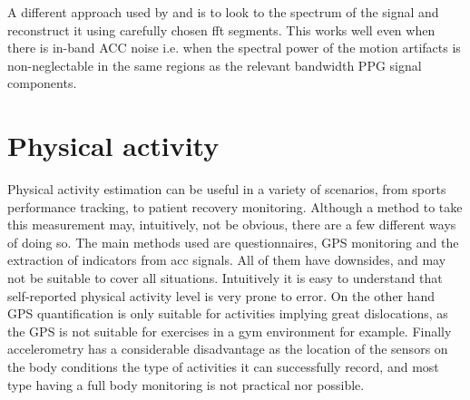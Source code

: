 A different approach used by \citet{zhang2015joss} and \citet{zhang2015troika} is to look to the spectrum of the signal and reconstruct it using carefully chosen \ac{fft} segments. This works well even when there is in-band ACC noise i.e. when the spectral power of the motion artifacts is non-neglectable in the same regions as the relevant bandwidth PPG signal components.


%
%

%

\section{Physical activity}

Physical activity estimation can be useful in a variety of scenarios, from sports performance tracking, to patient recovery monitoring. Although a method to take this measurement may, intuitively, not be obvious, there are a few different ways of doing so. The main methods used are questionnaires, GPS monitoring and the extraction of indicators from \ac{acc} signals. All of them have downsides, and may not be suitable to cover all situations. Intuitively it is easy to understand that self-reported physical activity level is very prone to error. On the other hand GPS quantification is only suitable for activities implying great dislocations, as the GPS is not suitable for exercises in a gym environment for example. Finally accelerometry has a considerable disadvantage as the location of the sensors on the body conditions the type of activities it can successfully record, and most type having a full body monitoring is not practical nor possible.


